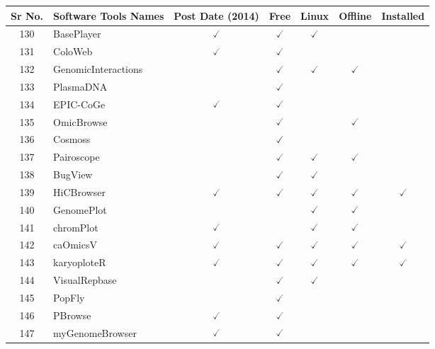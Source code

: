 \documentclass[10pt,letterpaper]{article}
\begin{document}
\begin{table}[!ht]
\begin{adjustwidth}{-2.25in}{0in} %
\centering
\begin{tabular}{|c|l|c|c|c|c|c|}
\hline
Sr No. & Software Tools Names & Post Date (2014) & Free & Linux & Offline & Installed \\ \hline
\hline
130 & BasePlayer\cite{katainen2017baseplayer} & $\checked$ & $\checked$ & $\checked$ & & \\ 
131 & ColoWeb\cite{kim2015coloweb} & $\checked$ & $\checked$ & & & \\ 
132 & GenomicInteractions\cite{harmston2015genomicinteractions} & & $\checked$ & $\checked$ & $\checked$ &  \\ 
133 & PlasmaDNA\cite{angers2007plasmadna} & & $\checked$ & & &  \\
134 & EPIC-CoGe\cite{nelson2018epic} & $\checked$ & $\checked$ & & & \\ 
135 & OmicBrowse\cite{toyoda2006omicbrowse} & & $\checked$ & & $\checked$ & \\ 
136 & Cosmoss\cite{rensing2005protein} & & $\checked$ & & & \\ 
137 & Pairoscope\cite{ding2010analysis} & & $\checked$ & $\checked$ & $\checked$ &  \\ 
138 & BugView\cite{leader2004bugview} & & $\checked$ & $\checked$ & & \\ 
139 & HiCBrowser\cite{yauy2018looking} & $\checked$ & $\checked$ & $\checked$ & $\checked$ & $\checked$  \\ 
140 & GenomePlot\cite{gibson2003genome} & & & $\checked$ & $\checked$ & \\
141 & chromPlot\cite{orostica2016chromplot} & $\checked$ & & $\checked$ & $\checked$ & \\
142 & caOmicsV\cite{zhang2016caomicsv} & $\checked$ & $\checked$ & $\checked$ & $\checked$ & $\checked$  \\ 
143 & karyoploteR\cite{gel2017karyoploter} & $\checked$ & $\checked$ & $\checked$ & $\checked$ & $\checked$  \\ 
144 & VisualRepbase\cite{tempel2008visualrepbase} & & $\checked$ & $\checked$ & & \\
145 & PopFly\cite{hervas2017popfly} & & $\checked$ & & & \\
146 & PBrowse\cite{szot2017pbrowse} & $\checked$ &  $\checked$ & & & \\
147 & myGenomeBrowser\cite{carrere2017mygenomebrowser} & $\checked$ &  $\checked$ & & & \\

\end{tabular}
\end{adjustwidth}
\end{table}
\end{document}
